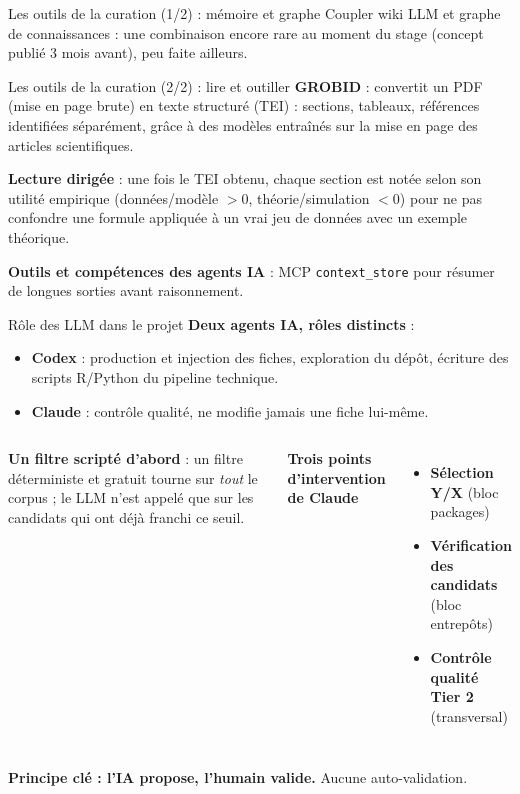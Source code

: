 \documentclass[aspectratio=169,11pt]{beamer}
\begin{document}
\begin{frame}{Les outils de la curation (1/2) : mémoire et graphe}
{\scriptsize\textcolor{mygray}{Coupler wiki LLM et graphe de connaissances : une combinaison encore rare au moment du stage (concept publié 3 mois avant), peu faite ailleurs.}}
\end{frame}

\begin{frame}{Les outils de la curation (2/2) : lire et outiller}
\footnotesize
\textbf{GROBID} : convertit un PDF (mise en page brute) en texte structuré
(TEI) : sections, tableaux, références identifiées séparément, grâce à des
modèles entraînés sur la mise en page des articles scientifiques.
\vspace{0.2cm}

\textbf{Lecture dirigée} : une fois le TEI obtenu, chaque section est notée
selon son utilité empirique (données/modèle $>0$, théorie/simulation $<0$)
pour ne pas confondre une formule appliquée à un vrai jeu de données avec un
exemple théorique.
\vspace{0.25cm}

\textbf{Outils et compétences des agents IA} : MCP \texttt{context\_store}
pour résumer de longues sorties avant raisonnement.
\end{frame}

\begin{frame}{Rôle des LLM dans le projet}
\footnotesize
\textbf{Deux agents IA, rôles distincts} :
\begin{itemize}\setlength\itemsep{0.08cm}
    \item \textbf{Codex} : production et injection des fiches, exploration du
    dépôt, écriture des scripts R/Python du pipeline technique.
    \item \textbf{Claude} : contrôle qualité, ne modifie jamais une fiche
    lui-même.
\end{itemize}
\vspace{0.25cm}
\begin{columns}[T]
\textbf{Un filtre scripté d'abord} : un filtre déterministe et gratuit tourne
sur \emph{tout} le corpus ; le LLM n'est appelé que sur les candidats qui ont
déjà franchi ce seuil.

\textbf{Trois points d'intervention de Claude}
\begin{itemize}\setlength\itemsep{0.12cm}
    \item \textbf{Sélection Y/X} (bloc packages)
    \item \textbf{Vérification des candidats} (bloc entrepôts)
    \item \textbf{Contrôle qualité Tier 2} (transversal)
\end{itemize}
\end{columns}
\vspace{0.2cm}
\centering\textbf{Principe clé : l'IA propose, l'humain valide.} Aucune auto-validation.
\end{frame}
\end{document}
